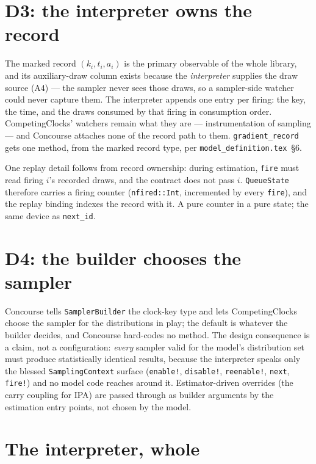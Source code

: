 \documentclass[11pt]{article}
\newcommand{\code}[1]{\texttt{#1}}
\begin{document}
\section{D3: the interpreter owns the record}

The marked record $(k_i, t_i, a_i)$ is the primary observable of the whole
library, and its auxiliary-draw column exists because the \emph{interpreter}
supplies the draw source (A4) --- the sampler never sees those draws, so a
sampler-side watcher could never capture them. The interpreter appends one
entry per firing: the key, the time, and the draws consumed by that firing
in consumption order. CompetingClocks' watchers remain what they are ---
instrumentation of sampling --- and Concourse attaches none of the record
path to them. \code{gradient\_record} gets one method, from the marked
record type, per \code{model\_definition.tex}~\S6.

One replay detail follows from record ownership: during estimation,
\code{fire} must read firing $i$'s recorded draws, and the contract does not
pass $i$. \code{QueueState} therefore carries a firing counter
(\code{nfired::Int}, incremented by every \code{fire}), and the replay
binding indexes the record with it. A pure counter in a pure state; the
same device as \code{next\_id}.

\section{D4: the builder chooses the sampler}

Concourse tells \code{SamplerBuilder} the clock-key type and lets
CompetingClocks choose the sampler for the distributions in play; the
default is whatever the builder decides, and Concourse hard-codes no method.
The design consequence is a claim, not a configuration: \emph{every} sampler
valid for the model's distribution set must produce statistically identical
results, because the interpreter speaks only the blessed
\code{SamplingContext} surface (\code{enable!}, \code{disable!},
\code{reenable!}, \code{next}, \code{fire!}) and no model code reaches
around it. Estimator-driven overrides (the carry coupling for IPA) are
passed through as builder arguments by the estimation entry points, not
chosen by the model.

\section{The interpreter, whole}
\end{document}
